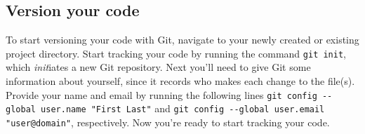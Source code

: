 \subsection{Version your code}

To start versioning your code with Git, navigate to your newly created or existing project directory. Start tracking your code by running the command \verb|git init|, which \textit{init}iates a new Git repository. Next you'll need to give Git some information about yourself, since it records who makes each change to the file(s). Provide your name and email by running the following lines \verb|git config --global user.name "First Last"| and \verb|git config --global user.email "user@domain"|, respectively. Now you're ready to start tracking your code.
